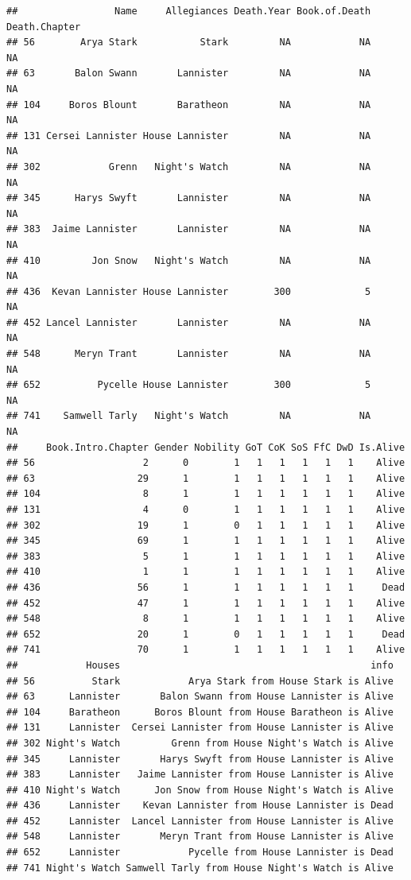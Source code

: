 \documentclass[]{book}
\begin{document}
\begin{verbatim}
##                 Name     Allegiances Death.Year Book.of.Death Death.Chapter
## 56        Arya Stark           Stark         NA            NA            NA
## 63       Balon Swann       Lannister         NA            NA            NA
## 104     Boros Blount       Baratheon         NA            NA            NA
## 131 Cersei Lannister House Lannister         NA            NA            NA
## 302            Grenn   Night's Watch         NA            NA            NA
## 345      Harys Swyft       Lannister         NA            NA            NA
## 383  Jaime Lannister       Lannister         NA            NA            NA
## 410         Jon Snow   Night's Watch         NA            NA            NA
## 436  Kevan Lannister House Lannister        300             5            NA
## 452 Lancel Lannister       Lannister         NA            NA            NA
## 548      Meryn Trant       Lannister         NA            NA            NA
## 652          Pycelle House Lannister        300             5            NA
## 741    Samwell Tarly   Night's Watch         NA            NA            NA
##     Book.Intro.Chapter Gender Nobility GoT CoK SoS FfC DwD Is.Alive
## 56                   2      0        1   1   1   1   1   1    Alive
## 63                  29      1        1   1   1   1   1   1    Alive
## 104                  8      1        1   1   1   1   1   1    Alive
## 131                  4      0        1   1   1   1   1   1    Alive
## 302                 19      1        0   1   1   1   1   1    Alive
## 345                 69      1        1   1   1   1   1   1    Alive
## 383                  5      1        1   1   1   1   1   1    Alive
## 410                  1      1        1   1   1   1   1   1    Alive
## 436                 56      1        1   1   1   1   1   1     Dead
## 452                 47      1        1   1   1   1   1   1    Alive
## 548                  8      1        1   1   1   1   1   1    Alive
## 652                 20      1        0   1   1   1   1   1     Dead
## 741                 70      1        1   1   1   1   1   1    Alive
##            Houses                                            info
## 56          Stark            Arya Stark from House Stark is Alive
## 63      Lannister       Balon Swann from House Lannister is Alive
## 104     Baratheon      Boros Blount from House Baratheon is Alive
## 131     Lannister  Cersei Lannister from House Lannister is Alive
## 302 Night's Watch         Grenn from House Night's Watch is Alive
## 345     Lannister       Harys Swyft from House Lannister is Alive
## 383     Lannister   Jaime Lannister from House Lannister is Alive
## 410 Night's Watch      Jon Snow from House Night's Watch is Alive
## 436     Lannister    Kevan Lannister from House Lannister is Dead
## 452     Lannister  Lancel Lannister from House Lannister is Alive
## 548     Lannister       Meryn Trant from House Lannister is Alive
## 652     Lannister            Pycelle from House Lannister is Dead
## 741 Night's Watch Samwell Tarly from House Night's Watch is Alive
\end{verbatim}
\end{document}
